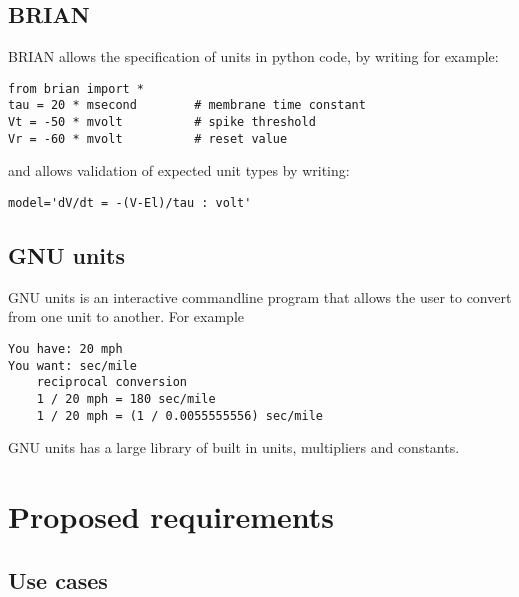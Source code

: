 \documentclass{article}
\begin{document}
\subsection*{BRIAN}
BRIAN allows the specification of units in python code, by writing for example:

\begin{lstlisting}
from brian import *
tau = 20 * msecond        # membrane time constant
Vt = -50 * mvolt          # spike threshold
Vr = -60 * mvolt          # reset value
\end{lstlisting}

and allows validation of expected unit types by writing:
\begin{lstlisting}
model='dV/dt = -(V-El)/tau : volt'
\end{lstlisting}


\subsection*{GNU units}
GNU units is an interactive commandline program that allows the user to convert from one unit to another.
For example
\begin{verbatim}
You have: 20 mph
You want: sec/mile
    reciprocal conversion
    1 / 20 mph = 180 sec/mile
    1 / 20 mph = (1 / 0.0055555556) sec/mile
\end{verbatim}
GNU units has a large library of built in units, multipliers and constants.



\newpage
\section{Proposed requirements} 
\subsection{Use cases}
\end{document}
